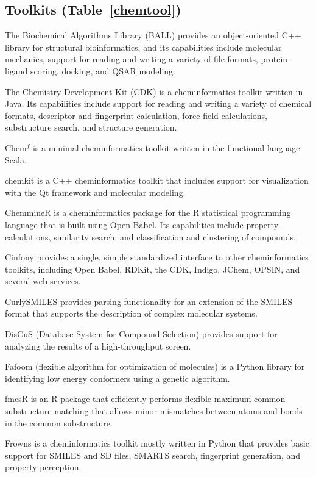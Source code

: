 \subsection*{Toolkits (Table~\ref{chemtool})} 
The Biochemical Algorithms Library (BALL) \cite{Hildebrandt_2010} provides an object-oriented C++ library for structural bioinformatics, and its capabilities include molecular mechanics, support for reading and writing a variety of file formats, protein-ligand scoring, docking, and QSAR modeling.

The Chemistry Development Kit (CDK) \cite{Steinbeck_2006} is a cheminformatics toolkit written in Java.  Its capabilities include support for reading and writing a variety of chemical formats, descriptor and fingerprint calculation, force field calculations, substructure search, and structure generation.

Chem$^f$ \cite{H_ck_2012} is a minimal cheminformatics toolkit written in the functional language Scala.

chemkit is a C++ cheminformatics toolkit that includes support for visualization with the Qt framework and molecular modeling.

ChemmineR \cite{Cao_2008}  is a cheminformatics package for the R statistical programming language that is built using Open Babel. Its capabilities include property calculations, similarity search, and classification and clustering of compounds.

Cinfony \cite{cinfony} provides a single, simple standardized interface to other cheminformatics toolkits, including Open Babel, RDKit, the CDK, Indigo, JChem, OPSIN, and several web services.

CurlySMILES \cite{Drefahl_2011} provides parsing functionality for an extension of the SMILES format that supports the description of complex molecular systems.

DisCuS (Database System for Compound Selection) \cite{W_jcikowski_2014} provides support for analyzing the results of a high-throughput screen.

Fafoom (flexible algorithm for optimization of molecules) \cite{Supady_2015} is a Python library for identifying low energy conformers using a genetic algorithm.

fmcsR \cite{Goecks_2010} is an R package that efficiently performs flexible maximum common substructure matching that allows minor mismatches between atoms and bonds in the common substructure.

Frowns is a cheminformatics toolkit mostly written in Python that provides basic support for SMILES and SD files, SMARTS search, fingerprint generation, and property perception.

